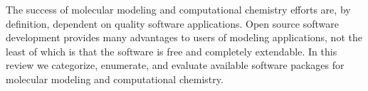 The success of molecular modeling and computational chemistry efforts are, by definition, dependent on quality software applications. Open source software development provides many advantages to users of modeling applications, not the least of which is that the software is free and completely extendable.  In this review we categorize, enumerate, and evaluate available software packages for molecular modeling and computational chemistry.